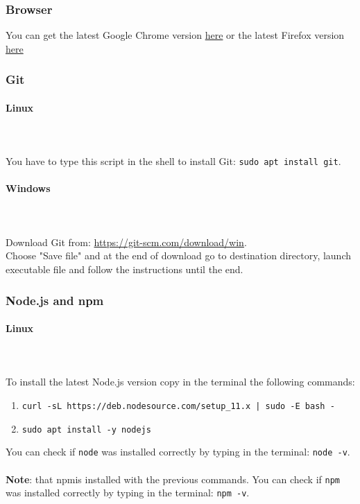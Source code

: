 \subsubsection{Browser}
You can get the latest Google Chrome version 
\href{https://www.google.com/chrome/}{here} or the latest Firefox version \href{https://www.mozilla.org/en-US/firefox/new/}{here}\\

\subsubsection{Git}
\paragraph{Linux} \mbox{} \\ \mbox{} \\
You have to type this script in the shell to install Git: 
\texttt{sudo apt install git}.
\paragraph{Windows} \mbox{} \\ \mbox{} \\
Download Git from: \url{https://git-scm.com/download/win}. \\
Choose "Save file" and at the end of download go to destination directory, launch executable file and follow the instructions until the end.

\subsubsection{Node.js and npm}
\paragraph{Linux} \mbox{} \\ \mbox{} \\
To install the latest Node.js version copy in the terminal the following commands:
\begin{enumerate}
	\item \texttt{curl -sL https://deb.nodesource.com/setup\_11.x | sudo -E bash -}
	\item \texttt{sudo apt install -y nodejs}
\end{enumerate} 
You can check if \texttt{node} was installed correctly by typing in the 
terminal: \texttt{node -v}.\\ \\
\textbf{Note}: that npm\glosp is installed with the previous commands. You can check if \texttt{npm} was installed correctly by typing in the 
terminal: \texttt{npm -v}.\\

